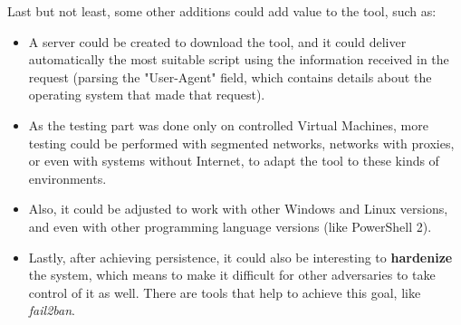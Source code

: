 \pagebreak
Last but not least, some other additions could add value to the tool, such as: 
\begin{itemize}
\item A server could be created to download the tool, and it could deliver automatically the most suitable script using the information received in the request (parsing the "User-Agent" field, which contains details about the operating system that made that request).
\item As the testing part was done only on controlled Virtual Machines, more testing could be performed with segmented networks, networks with proxies, or even with systems without Internet, to adapt the tool to these kinds of environments.
\item Also, it could be adjusted to work with other Windows and Linux versions, and even with other programming language versions (like PowerShell 2).
\item Lastly, after achieving persistence, it could also be interesting to \textbf{hardenize} the system, which means to make it difficult for other adversaries to take control of it as well. There are tools that help to achieve this goal, like \textit{fail2ban}\cite{fail2ban}.
\end{itemize}

